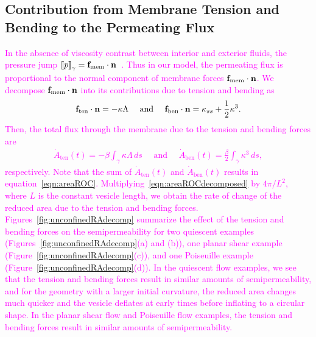 \documentclass[prb,preprint,showpacs,preprintnumbers,amsmath,amssymb,longbibliography]{revtex4-1}
\begin{document}
\subsection{Contribution from Membrane Tension and Bending to the Permeating Flux}
\textcolor{magenta}{In the absence of viscosity contrast between interior and exterior fluids, the pressure jump $\left[\!\left[ p \right]\!\right]_\gamma= \mathbf{f}_\mathrm{mem} \cdot
\mathbf{n}$~\cite{poz1992}. Thus in our model, the permeating flux is
proportional to the normal component of membrane forces $\mathbf{f}_\mathrm{mem}\cdot\mathbf{n}$. We
decompose $\mathbf{f}_\mathrm{mem}\cdot\mathbf{n}$ into its
contributions due to tension and bending as
\begin{align}
  \mathbf{f}_{\mathrm{ten}} \cdot \mathbf{n} = -\kappa \Lambda 
    \quad \text{ and } \quad
  \mathbf{f}_{\mathrm{ben}} \cdot \mathbf{n} = \kappa_{ss} + \frac{1}{2}\kappa^3.
\end{align}
Then, the total flux through the membrane due to the tension and bending
forces are
\begin{align}
  \dot{A}_{\mathrm{ten}}(t) = -\beta \int_{\gamma} \kappa \Lambda\, ds  
  \quad \text{ and } \quad
  \dot{A}_{\mathrm{ben}}(t) = \frac{\beta}{2} \int_{\gamma} \kappa^3\, ds,
  \label{eqn:areaROCdecomposed}
\end{align}
respectively. Note that the sum of $\dot{A}_{\mathrm{ten}}(t)$ and
$\dot{A}_{\mathrm{ben}}(t)$ results in equation~\eqref{eqn:areaROC}.
Multiplying~\eqref{eqn:areaROCdecomposed} by $4\pi/L^2$, where $L$
is the constant  vesicle length, we obtain the rate of change of the reduced area
due to the tension and bending forces. 
Figures~\ref{fig:unconfinedRAdecomp} summarize the 
effect of the tension and bending forces on the semipermeability for two
quiescent examples (Figures~\ref{fig:unconfinedRAdecomp}(a) and (b)),
one planar shear example (Figure~\ref{fig:unconfinedRAdecomp}(c)), and
one Poiseuille example (Figure~\ref{fig:unconfinedRAdecomp}(d)). In the
quiescent flow examples, we see that the tension and bending forces
result in similar amounts of semipermeability, and for the geometry with
a larger initial curvature, the reduced area changes much quicker and
the vesicle deflates at early times before inflating to a circular
shape. In the planar shear flow and Poiseuille flow examples, the
tension and bending forces result in similar amounts of
semipermeability.}
\end{document}
